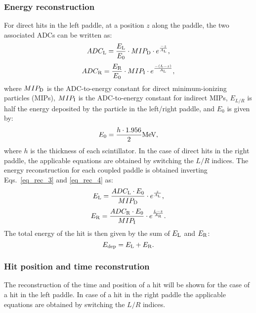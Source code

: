 \subsubsection{Energy reconstruction}
For direct hits in the left paddle, at a position $z$ along the paddle, the two associated ADCs can be written as:
\begin{equation}
\label{eq_rec_3}
ADC_{\rm{L}}=\frac{E_{\rm{L}}}{E_0}\cdot MIP_{\rm{D}}\cdot e^{\frac{-z}{A_{\rm{L}}}},
\end{equation}
\begin{equation}
\label{eq_rec_4}
ADC_{\rm{R}}=\frac{E_{\rm{R}}}{E_0}\cdot MIP_{\rm{I}}\cdot e^{\frac{-(L-z)}{A_{\rm{L}}}},
\end{equation}
where $MIP_{\rm{D}}$ is the ADC-to-energy constant for direct minimum-ionizing particles (MIPs), $MIP_{\rm{I}}$ is the ADC-to-energy constant for indirect MIPs, $E_{L/R}$ is half the energy deposited by the particle in the left/right paddle, and $E_0$ is given by:
\begin{equation}\label{eq_def_e0}
E_0=\frac{h\cdot 1.956}{2} \rm{MeV},
\end{equation}
where $h$ is the thickness of each scintillator.
In the case of direct hits in the right paddle, the applicable equations are obtained by switching the $L/R$ indices.
The energy reconstruction for each coupled paddle is obtained inverting Eqs.~\ref{eq_rec_3} and \ref{eq_rec_4} as:
\begin{equation}
E_{\rm{L}}=\frac{ADC_{\rm{L}} \cdot E_0}{MIP_{\rm{D}}}\cdot e^{\frac{z}{A_{\rm{L}}}},
\end{equation}
\begin{equation}
E_{\rm{R}}=\frac{ADC_{\rm{R}} \cdot E_0}{MIP_{\rm{I}}}\cdot e^{\frac{L-z}{A_{\rm{R}}}}.
\end{equation}
The total energy of the hit is then given by the sum of $E_{\rm{L}}$ and $E_{\rm{R}}$:
\begin{equation}
E_{\rm{dep}}=E_{\rm{L}}+E_{\rm{R}}.
\end{equation}

\subsubsection{Hit position and time reconstrution}
The reconstruction of the time and position of a hit will be shown for the case of a hit in the left paddle. In case of a hit in the right paddle the applicable equations are obtained by switching the $L/R$ indices.


